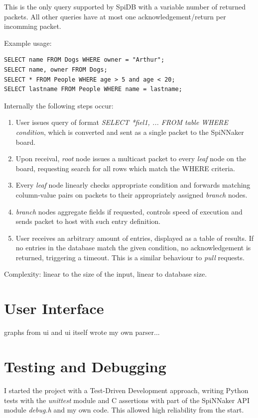 This is the only query supported by SpiDB with a variable number of returned packets. All other queries have at most one acknowledgement/return per incomming packet. 

Example usage:
\begin{lstlisting}
SELECT name FROM Dogs WHERE owner = "Arthur";
SELECT name, owner FROM Dogs;
SELECT * FROM People WHERE age > 5 and age < 20;
SELECT lastname FROM People WHERE name = lastname;
\end{lstlisting}
   
Internally the following steps occur:
\begin{enumerate}
\item User issues query of format \textit{SELECT *\textbar fiel1, ... FROM table WHERE condition}, which is converted and sent as a single packet to the SpiNNaker board.
\item Upon receival, \textit{root} node issues a multicast packet to every \textit{leaf} node on the board, requesting search for all rows which match the WHERE criteria.
\item Every \textit{leaf} node linearly checks appropriate condition and forwards matching column-value pairs on packets to their appropriately assigned \textit{branch} nodes.
\item \textit{branch} nodes aggregate fields if requested, controls speed of execution and sends packet to host with such entry definition.
\item User receives an arbitrary amount of entries, displayed as a table of results. If no entries in the database match the given condition, no acknowledgement is returned, triggering a timeout. This is a similar behaviour to \textit{pull} requests.
\end{enumerate}

Complexity: linear to the size of the input, linear to database size.
 
\section{User Interface} 

graphs from ui and ui itself 
wrote my own parser...


\section{Testing and Debugging}
I started the project with a Test-Driven Development approach, writing Python tests with the \textit{unittest} module and C assertions with part of the SpiNNaker API module \textit{debug.h} and my own code. This allowed high reliability from the start.

